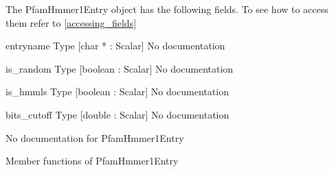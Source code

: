 \label{object_PfamHmmer1Entry}

The PfamHmmer1Entry object has the following fields. To see how to access them refer to \ref{accessing_fields}
\begin{description}
\item{entryname} Type [char * : Scalar] No documentation

\item{is_random} Type [boolean : Scalar] No documentation

\item{is_hmmls} Type [boolean : Scalar] No documentation

\item{bits_cutoff} Type [double : Scalar] No documentation

\end{description}
No documentation for PfamHmmer1Entry

Member functions of PfamHmmer1Entry


